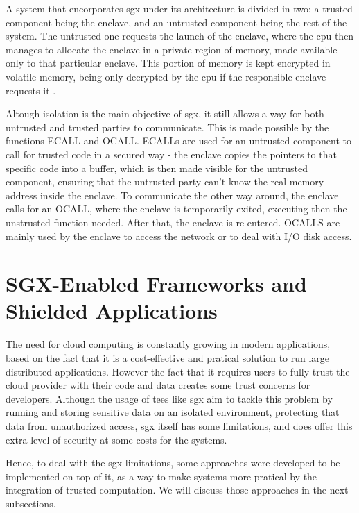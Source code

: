 A system that encorporates \gls{sgx} under its architecture is divided in two: a trusted component being the enclave, and an untrusted component being the rest of the system. The untrusted one requests the launch of the enclave, where the \gls{cpu} then manages to allocate the enclave in a private region of memory, made available only to that particular enclave. This portion of memory is kept encrypted in volatile memory, being only decrypted by the \gls{cpu} if the responsible enclave requests it \cite{guiBorgesThesis}.

Altough isolation is the main objective of \gls{sgx}, it still allows a way for both  untrusted and trusted parties to communicate. This is made possible by the functions ECALL and OCALL. ECALLs are used for an untrusted component to call for trusted code in a secured way - the enclave copies the pointers to that specific code into a buffer, which is then made visible for the untrusted component, ensuring that the untrusted party can't know the real memory address inside the enclave. To communicate the other way around, the enclave calls for an OCALL, where the enclave is temporarily exited, executing then the unstrusted function needed. After that, the enclave is re-entered. OCALLS are mainly used by the enclave to access the network or to deal with I/O disk access.



\section{SGX-Enabled Frameworks and Shielded Applications}
\label{sec:sgxFrameworks}
The need for cloud computing is constantly growing in modern applications, based on the fact that it is a cost-effective and pratical solution to run large distributed applications. However the fact that it requires users to fully trust the cloud provider with their code and data creates some trust concerns for developers.
Although the usage of \gls{tee}s like \gls{sgx} aim to tackle this problem by running and storing sensitive data on an isolated environment, protecting that data from unauthorized access, \gls{sgx} itself has some limitations, and does offer this extra level of security at some costs for the systems. 

Hence, to deal with the \gls{sgx} limitations, some approaches were developed to be implemented on top of it, as a way to make systems more pratical by the integration of trusted computation. 
We will discuss those approaches in the next subsections.



